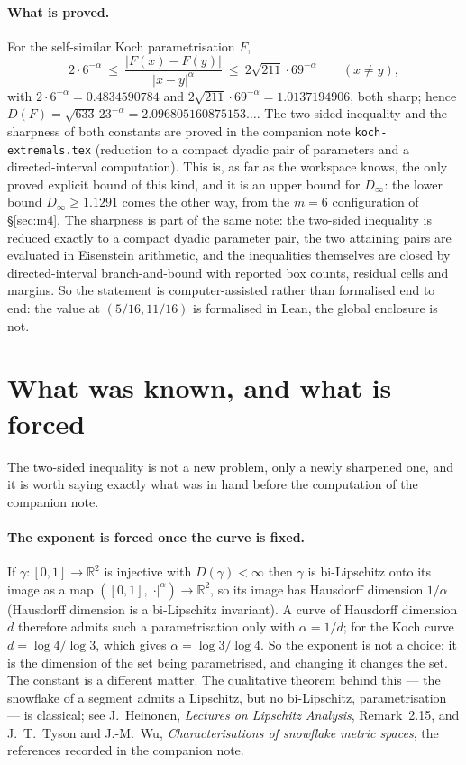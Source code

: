 \documentclass[11pt]{article}
\theoremstyle{remark}
\newcommand{\R}{\mathbb{R}}
\newcommand{\alp}{\alpha}
\begin{document}
\paragraph{What is proved.} For the self-similar Koch parametrisation $F$,
\begin{equation}\label{eq:koch}
  2\cdot 6^{-\alp}\ \le\ \frac{|F(x)-F(y)|}{|x-y|^{\alp}}\ \le\ 2\sqrt{211}\cdot 69^{-\alp}
  \qquad (x\ne y),
\end{equation}
with $2\cdot6^{-\alp}=0.4834590784$ and $2\sqrt{211}\cdot69^{-\alp}=1.0137194906$, both sharp;
hence $D(F)=\sqrt{633}\,23^{-\alp}=2.096805160875153\ldots$. The two-sided inequality and the
sharpness of both constants are proved in the companion note \texttt{koch-extremals.tex}
(reduction to a compact dyadic pair of parameters and a directed-interval computation).
This is, as far as the workspace knows, the only proved explicit bound of this kind, and it is
an upper bound for $D_\infty$: the lower bound $D_\infty\ge1.1291$ comes the other way,
from the $m=6$ configuration of \S\ref{sec:m4}. The sharpness is part of the
same note: the two-sided inequality is reduced exactly to a compact dyadic parameter pair, the two
attaining pairs are evaluated in Eisenstein arithmetic, and the inequalities themselves are closed
by directed-interval branch-and-bound with reported box counts, residual cells and margins. So the
statement is computer-assisted rather than formalised end to end: the value at $(5/16,11/16)$ is
formalised in Lean, the global enclosure is not.

\section{What was known, and what is forced}\label{sec:prior}

The two-sided inequality is not a new problem, only a newly sharpened one, and it is worth
saying exactly what was in hand before the computation of the companion note.

\paragraph{The exponent is forced once the curve is fixed.} If $\gamma\colon[0,1]\to\R^2$ is
injective with $D(\gamma)<\infty$ then $\gamma$ is bi-Lipschitz onto its image as a map
$([0,1],|\cdot|^{\alp})\to\R^2$, so its image has Hausdorff dimension $1/\alp$ (Hausdorff dimension
is a bi-Lipschitz invariant). A curve of Hausdorff dimension $d$ therefore admits such a
parametrisation only with $\alp=1/d$; for the Koch curve $d=\log4/\log3$, which gives
$\alp=\log3/\log4$. So the exponent is not a choice: it is the dimension of the set being
parametrised, and changing it changes the set. The constant is a different matter. The qualitative theorem behind this --- the snowflake
of a segment admits a Lipschitz, but no bi-Lipschitz, parametrisation --- is classical; see
J.~Heinonen, \emph{Lectures on Lipschitz Analysis}, Remark~2.15, and J.~T.~Tyson and J.-M.~Wu,
\emph{Characterisations of snowflake metric spaces}, the references recorded in the companion
note.
\end{document}
